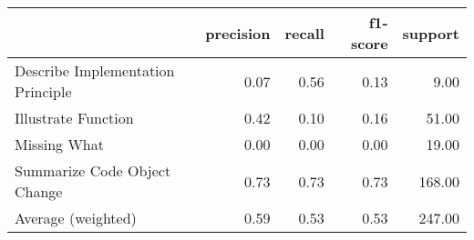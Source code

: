 \begin{tabular}{lrrrr}
\toprule
 & precision & recall & f1-score & support \\
\midrule
Describe Implementation Principle & 0.07 & 0.56 & 0.13 & 9.00 \\
Illustrate Function & 0.42 & 0.10 & 0.16 & 51.00 \\
Missing What & 0.00 & 0.00 & 0.00 & 19.00 \\
Summarize Code Object Change & 0.73 & 0.73 & 0.73 & 168.00 \\
Average (weighted) & 0.59 & 0.53 & 0.53 & 247.00 \\
\bottomrule
\end{tabular}
